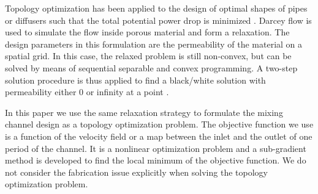 

Topology optimization has been applied to the design of optimal shapes
of pipes or diffusers such that the total potential power drop is
minimized \cite{Evgrafov2005, Borrvall2003}. Darcey flow is used to
simulate the flow inside porous material and form a relaxation. The
design parameters in this formulation are the permeability of the
material on a spatial grid. In this case, the relaxed problem is still
non-convex, but can be solved by means of sequential separable and
convex programming. A two-step solution procedure is thus applied to
find a black/white solution with permeability either $0$ or infinity
at a point .

In this paper we use the same relaxation strategy to formulate the
mixing channel design as a topology optimization problem. The
objective function we use is a function of the velocity field or a map
between the inlet and the outlet of one period of the channel. It is a
nonlinear optimization problem and a sub-gradient method is developed
to find the local minimum of the objective function. We do not
consider the fabrication issue explicitly when solving the topology
optimization problem.



